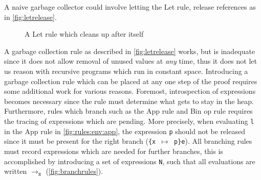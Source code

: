 A naive garbage collector could involve letting the Let rule, release references as in \autoref{fig:letrelease}.
\begin{figure}[ht]
	\begin{mdframed}
		\begin{prooftree}
		\end{prooftree}
	\end{mdframed}
	\caption{A Let rule which cleans up after itself}
	\label{fig:letrelease}
\end{figure}
A garbage collection rule as described in \autoref{fig:letrelease} works, but is inadequate since it does not allow removal of unused values at \textit{any} time, thus it does not let us reason with recursive programs which run in constant space.
Introducing a garbage collection rule which can be placed at any one step of the proof requires some additional work for various reasons.
Foremost, introspection of expressions becomes necessary since the rule must determine what gets to stay in the heap.
Furthermore, rules which branch such as the App rule and Bin op rule requires the tracing of expressions which are pending.
More precisely, when evaluating \texttt{l} in the App rule in \autoref{fig:rules:env:app}, the expression \texttt{p} should not be released since it must be present for the right branch (\texttt{\{x $\mapsto$ p\}e}).
All branching rules must record expressions which are needed for further branches, this is accomplished by introducing a set of expressions \texttt{N}, such that all evaluations are written $\rightarrow_{\texttt{N}}$ (\autoref{fig:branchrules}).
